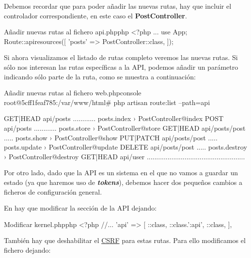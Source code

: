 Debemos recordar que para poder añadir las nuevas rutas, hay que incluir el controlador correspondiente, en este caso el \textbf{PostController}.


\begin{mycode}{Añadir nuevas rutas al fichero api.php}{php}{}
<?php
...
use App\Http\Controllers\PostController;
Route::apiresources([
    'posts' => PostController::class,
]);
\end{mycode}

Si ahora visualizamos el listado de rutas completo veremos las nuevas rutas. Si sólo nos interesan las rutas específicas a la API, podemos añadir un parámetro indicando sólo parte de la ruta, como se muestra a continuación:


\begin{mycode}{Añadir nuevas rutas al fichero web.php}{console}{{\small }}
root@5cff1feaf785:/var/www/html# php artisan route:list --path=api

GET|HEAD        api/posts ............ posts.index › PostController@index
POST            api/posts ............ posts.store › PostController@store
GET|HEAD        api/posts/{post} ..... posts.show › PostController@show
PUT|PATCH       api/posts/{post} ..... posts.update › PostController@update
DELETE          api/posts/{post} ..... posts.destroy › PostController@destroy
GET|HEAD        api/user ....................................................
\end{mycode}

Por otro lado, dado que la API es un sistema en el que no vamos a guardar un estado (ya que haremos uso de \textit{\textbf{tokens}}), debemos hacer dos pequeños cambios a ficheros de configuración general.


En  hay que modificar la sección de la API dejando:

\begin{mycode}{Modificar kernel.php}{php}{\small}
<?php
//...
'api' => [
    \Laravel\Sanctum\Http\Middleware\EnsureFrontendRequestsAreStateful::class,
    \Illuminate\Routing\Middleware\ThrottleRequests::class.':api',
    \Illuminate\Routing\Middleware\SubstituteBindings::class,
],
\end{mycode}

También hay que deshabilitar el \href{https://en.wikipedia.org/wiki/Cross-site\_request\_forgery}{CSRF} para estas rutas. Para ello modificamos el fichero  dejando:

